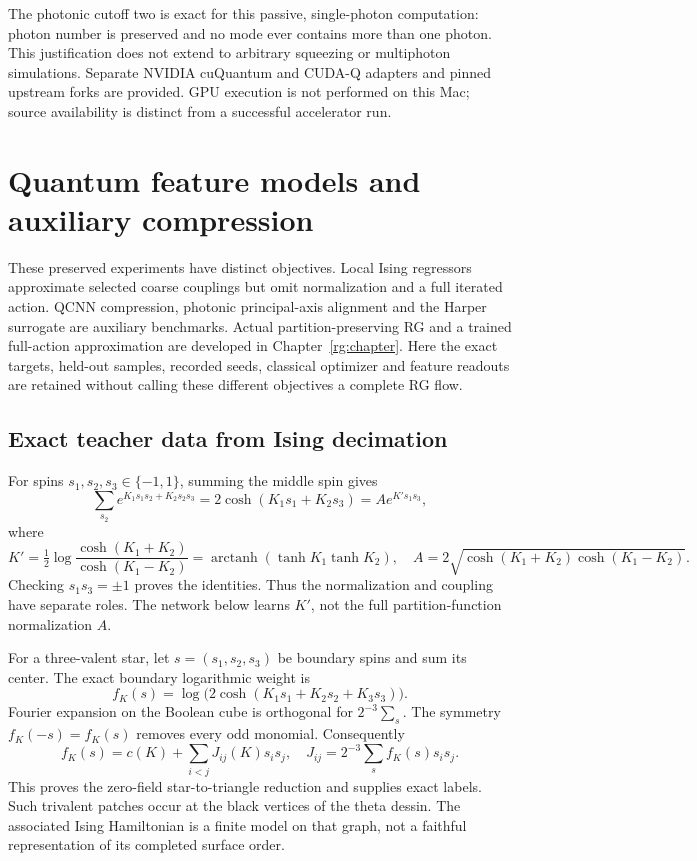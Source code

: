 \documentclass[11pt,oneside,openany]{book}
\theoremstyle{definition}\newtheorem{definition}[theorem]{Definition}
\theoremstyle{remark}\newtheorem{remark}[theorem]{Remark}
\begin{document}
The photonic cutoff two is exact for this passive, single-photon computation: photon number is preserved and no mode ever contains more than one photon. This justification does not extend to arbitrary squeezing or multiphoton simulations. Separate NVIDIA cuQuantum and CUDA-Q adapters and pinned upstream forks are provided. GPU execution is not performed on this Mac; source availability is distinct from a successful accelerator run.

\chapter{Quantum feature models and auxiliary compression}
\label{book:learning}
These preserved experiments have distinct objectives. Local Ising regressors approximate selected coarse couplings but omit normalization and a full iterated action. QCNN compression, photonic principal-axis alignment and the Harper surrogate are auxiliary benchmarks. Actual partition-preserving RG and a trained full-action approximation are developed in Chapter~\ref{rg:chapter}. Here the exact targets, held-out samples, recorded seeds, classical optimizer and feature readouts are retained without calling these different objectives a complete RG flow.

\section{Exact teacher data from Ising decimation}
For spins $s_1,s_2,s_3\in\{-1,1\}$, summing the middle spin gives
\[
 \sum_{s_2}e^{K_1s_1s_2+K_2s_2s_3}
 =2\cosh(K_1s_1+K_2s_3)
 =A e^{K' s_1s_3},
\]
where
\[
 K'=\tfrac12\log\frac{\cosh(K_1+K_2)}{\cosh(K_1-K_2)}
 =\operatorname{arctanh}(\tanh K_1\tanh K_2),\quad
 A=2\sqrt{\cosh(K_1+K_2)\cosh(K_1-K_2)}.
\]
Checking $s_1s_3=\pm1$ proves the identities. Thus the normalization and coupling have separate roles. The network below learns $K'$, not the full partition-function normalization $A$.

For a three-valent star, let $s=(s_1,s_2,s_3)$ be boundary spins and sum its center. The exact boundary logarithmic weight is
\[
 f_K(s)=\log\bigl(2\cosh(K_1s_1+K_2s_2+K_3s_3)\bigr).
\]
Fourier expansion on the Boolean cube is orthogonal for $2^{-3}\sum_s$. The symmetry $f_K(-s)=f_K(s)$ removes every odd monomial. Consequently
\[
 f_K(s)=c(K)+\sum_{i<j}J_{ij}(K)s_is_j,\quad
 J_{ij}=2^{-3}\sum_s f_K(s)s_is_j.
\]
This proves the zero-field star-to-triangle reduction and supplies exact labels. Such trivalent patches occur at the black vertices of the theta dessin. The associated Ising Hamiltonian is a finite model on that graph, not a faithful representation of its completed surface order.
\end{document}

